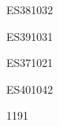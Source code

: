 \documentclass[a4paper,11pt]{report}
\begin{document}
\begin{exol}{ES38}{103}{2}
\end{exol}

\begin{exol}{ES39}{103}{1}
\end{exol}

\begin{exol}{ES37}{102}{1}
\end{exol}

\begin{exol}{ES40}{104}{2}
\end{exol}

\begin{FLP}{119}{1}
\end{FLP}
\end{document}
